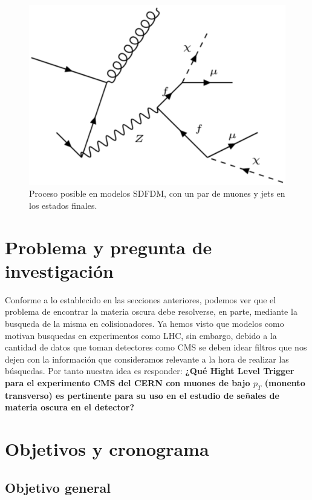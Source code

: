 \begin{figure}
 	\centering
 	\includegraphics[width=13cm]{F6.png}
 	\caption{\label{fig:frog} Proceso posible en modelos SDFDM, con un par de muones y jets en los estados finales.}
\end{figure}

\newpage
\section{Problema y pregunta de investigación}

	Conforme a lo establecido en las secciones anteriores, podemos ver que el problema de encontrar la materia oscura debe resolverse, en parte, mediante la busqueda de la misma en colisionadores. Ya hemos visto que modelos como \cite{1475-7516-2016-03-048} motivan busquedas en experimentos como LHC, sin embargo, debido a la cantidad de datos que toman detectores como CMS se deben idear filtros que nos dejen con la información que consideramos relevante a la hora de realizar las búsquedas. Por tanto nuestra idea es responder: \textbf{¿Qué Hight Level Trigger para el experimento CMS del CERN con muones de bajo $p_T$ (monento transverso) es pertinente para su uso en el estudio de señales de materia oscura en el detector?}


\newpage
\section{Objetivos y cronograma}


\subsection{Objetivo general}

